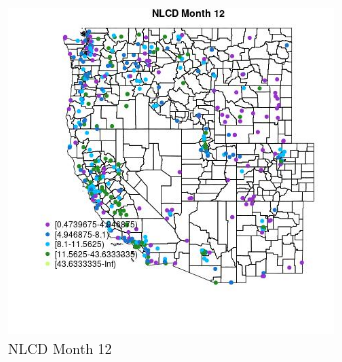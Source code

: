 \clearpage 

\begin{figure} 
\centering  
\includegraphics[width=0.77\textwidth]{Code_Outputs/ML_input_report_ML_input_PM25_Step5_part_d_de_duplicated_aves_ML_input_MapObsMo12NLCD.jpg} 
\caption{\label{fig:ML_input_report_ML_input_PM25_Step5_part_d_de_duplicated_aves_ML_inputMapObsMo12NLCD}NLCD Month 12} 
\end{figure} 
 
